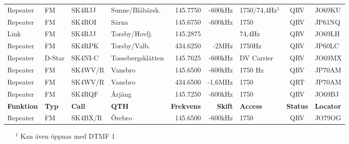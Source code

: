 \begin{landscape}
\begin{longtable}{llllrrlcl}
	Repeater          & FM           & SK4RJJ        & Sunne/Blåbärsk.     &          145.7750 &        -600kHz & 1750/74,4Hz$^1$ &       QRV       & JO69KU           \\
	Repeater          & FM           & SK4ROI        & Särna               &          145.6750 &        -600kHz & 1750            &       QRV       & JP61NQ           \\
	Link              & FM           & SK4RJJ        & Torsby/Hovfj.       &          145.2875 &                & 74,4Hz          &       QRV       & JO69LH           \\
	Repeater          & FM           & SK4RPK        & Torsby/Valb.        &          434.6250 &          -2MHz & 1750Hz          &       QRV       & JP60LC           \\
	Repeater          & D-Star       & SK4NI-C       & Tossebergsklätten   &          145.7625 &        -600kHz & DV Carrier      &       QRV       & JO69MX           \\
	Repeater          & FM           & SK4WV/R       & Vansbro             &          145.6500 &        -600kHz & 1750 Hz         &       QRV       & JP70AM           \\
	Repeater          & FM           & SK4WV/R       & Vansbro             &          434.6500 &        -1,6MHz & 1750            &       QRT       & JP70AM           \\
	Repeater          & FM           & SK4RQF        & Årjäng              &          145.7250 &        -600kHz & 1750            &       QRV       & JO69BJ           \\
	\textbf{Funktion} & \textbf{Typ} & \textbf{Call} & \textbf{QTH}        & \textbf{Frekvens} & \textbf{Skift} & \textbf{Access} & \textbf{Status} & \textbf{Locator} \\ \hline
	Repeater          & FM           & SK4BX/R       & Örebro              &          145.6500 &        -600kHz & 1750            &       QRV       & JO79OG
\end{longtable}
\begin{itemize}
\item[$^1$] Kan även öppnas med DTMF 1
\end{itemize}

\end{landscape}
